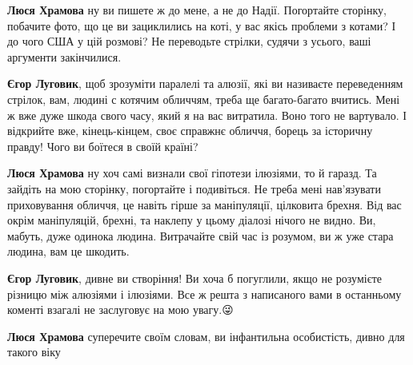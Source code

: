 \begin{itemize}
\begin{itemize}
\textbf{Люся Храмова} ну ви пишете ж до мене, а не до Надії. Погортайте
сторінку, побачите фото, що це ви зациклились на коті, у вас якісь проблеми з
котами? І до чого США у цій розмові? Не переводьте стрілки, судячи з усього,
ваші аргументи закінчилися.



\textbf{Єгор Луговик}, щоб зрозуміти паралелі та алюзії, які ви називаєте
переведенням стрілок, вам, людині с котячим обличчям, треба ще багато-багато
вчитись. Мені ж вже дуже шкода свого часу, який я на вас витратила. Воно того
не вартувало. І відкрийте вже, кінець-кінцем, своє справжнє обличчя, борець за
історичну правду! Чого ви боїтеся в своїй країні?

\textbf{Люся Храмова} ну хоч самі визнали свої гіпотези ілюзіями, то й гаразд.
Та зайдіть на мою сторінку, погортайте і подивіться. Не треба мені нав'язувати
приховування обличчя, це навіть гірше за маніпуляції, цілковита брехня. Від вас
окрім маніпуляцій, брехні, та наклепу у цьому діалозі нічого не видно. Ви,
мабуть, дуже одинока людина. Витрачайте свій час із розумом, ви ж уже стара
людина, вам це шкодить.


\textbf{Єгор Луговик}, дивне ви створіння! Ви хоча б погуглили, якщо не
розумієте різницю між алюзіями і ілюзіями. Все ж решта з написаного вами в
останньому коменті взагалі не заслуговує на мою увагу.😜

\textbf{Люся Храмова} суперечите своїм словам, ви інфантильна особистість,
дивно для такого віку\Laughey[1.0][white]

\end{itemize}
\end{itemize}

